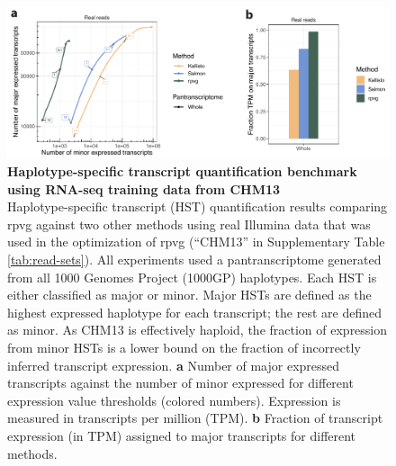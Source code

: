\documentclass[11pt]{ucthesis}
\begin{document}
\begin{figure}[H]
\begin{center}
\includegraphics[width=\textwidth]{mpmapfigures/figureS8.pdf}
\caption{\textbf{Haplotype-specific transcript quantification benchmark using RNA-seq training data from CHM13} \\
Haplotype-specific transcript (HST) quantification results comparing rpvg against two other methods using real Illumina data that was used in the optimization of rpvg (``CHM13'' in Supplementary Table \ref{tab:read-sets}). All experiments used a pantranscriptome generated from all 1000 Genomes Project (1000GP) haplotypes. Each HST is either classified as major or minor. Major HSTs are defined as the highest expressed haplotype for each transcript; the rest are defined as minor. As CHM13 is effectively haploid, the fraction of expression from minor HSTs is a lower bound on the fraction of incorrectly inferred transcript expression. \textbf{a} Number of major expressed transcripts against the number of minor expressed for different expression value thresholds (colored numbers). Expression is measured in transcripts per million (TPM). \textbf{b} Fraction of transcript expression (in TPM) assigned to major transcripts for different methods.
} \label{fig:expression-t2t}
\end{center}
\end{figure}
\end{document}
